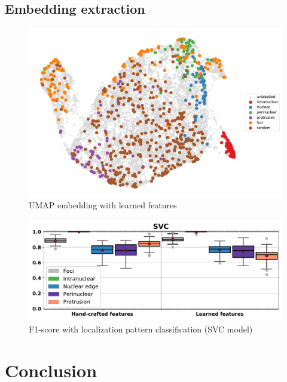 \subsection{Embedding extraction} \label{subsec:learned_embedding}


\begin{figure}[h]
    \centering
    \includegraphics[width=1\textwidth]{figures/chapter4/umap_real}
    \caption{UMAP embedding with learned features}
    \label{fig:umap_real}
\end{figure}

\begin{figure}[h]
    \centering
    \includegraphics[width=1\textwidth]{figures/chapter4/f1_SVC}
    \caption{F1-score with localization pattern classification (SVC model)}
    \label{fig:f1_SVC_real}
\end{figure}


\section{Conclusion} \label{sec:analysis_conclusion}

